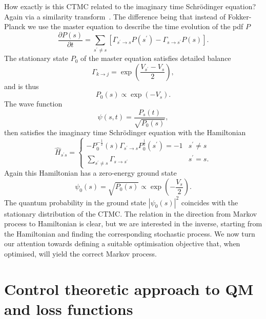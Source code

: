 How exactly is this CTMC related to the imaginary time Schr\" odinger equation? Again via a similarity transform~\cite{castelnovo2005quantum}. The difference being that instead of Fokker-Planck we use the master equation to describe the time evolution of the pdf $P$
\begin{equation}
\frac{\partial P(s)}{\partial t}=\sum_{s^\prime \neq s}\left[\Gamma_{s^\prime \rightarrow s} P(s^\prime)-\Gamma_{s \rightarrow s^\prime} P(s)\right].
\end{equation}
The stationary state $P_0$ of the master equation satisfies detailed balance
\begin{equation}
	\Gamma_{k \rightarrow j}=\exp \left(\frac{V_{s^\prime}-V_{s}}{2}\right),
\end{equation}
and is thus
\begin{equation}
	P_{0}(s) \propto \exp \left(-V_{s}\right).
\end{equation}
The wave function 
\begin{equation}
	\psi(s, t)=\frac{P_{s}(t)}{\sqrt{P_{0}(s)}},
\end{equation}
then satisfies the imaginary time Schr\" odinger equation with the Hamiltonian
\begin{equation}
	\hat H_{s^\prime s}=\left\{\begin{array}{ll}
	-P_{0}^{-\frac{1}{2}}(s) \Gamma_{s^\prime \rightarrow s} P_{0}^{\frac{1}{2}}(s^\prime)=-1 & s^\prime \neq s \\
	\sum_{s^\prime \neq s} \Gamma_{s \rightarrow s^\prime} & s^\prime=s.
	\end{array}\right. 
\end{equation}
Again this Hamiltonian has a zero-energy ground state 
\begin{equation}
	\psi_{0}(s)=\sqrt{P_{0}(s)} \propto \exp \left(-\frac{V_{s}}{2}\right).
\end{equation}
The quantum probability in the ground state $|\psi_0(s)|^2$ coincides with the stationary distribution of the CTMC. The relation in the direction from Markov process to Hamiltonian is clear, but we are interested in the inverse, starting from the Hamiltonian and finding the corresponding stochastic process. We now turn our attention towards defining a suitable optimisation objective that, when optimised, will yield the correct Markov process.

\section{Control theoretic approach to QM and loss functions}
\label{sec:control_loss}
